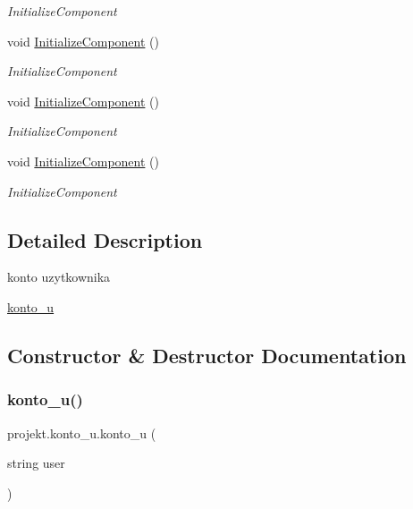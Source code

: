 \begin{DoxyCompactItemize}
\begin{DoxyCompactList}\small\item\em Initialize\+Component \end{DoxyCompactList}\item 
void \mbox{\hyperlink{classprojekt_1_1konto__u_aba94445ce67074714f9c38935885c165}{Initialize\+Component}} ()
\begin{DoxyCompactList}\small\item\em Initialize\+Component \end{DoxyCompactList}\item 
void \mbox{\hyperlink{classprojekt_1_1konto__u_aba94445ce67074714f9c38935885c165}{Initialize\+Component}} ()
\begin{DoxyCompactList}\small\item\em Initialize\+Component \end{DoxyCompactList}\item 
void \mbox{\hyperlink{classprojekt_1_1konto__u_aba94445ce67074714f9c38935885c165}{Initialize\+Component}} ()
\begin{DoxyCompactList}\small\item\em Initialize\+Component \end{DoxyCompactList}\end{DoxyCompactItemize}


\subsection{Detailed Description}
konto uzytkownika 

\mbox{\hyperlink{classprojekt_1_1konto__u}{konto\+\_\+u}} 

\subsection{Constructor \& Destructor Documentation}
\mbox{\label{classprojekt_1_1konto__u_a3aac4a0ac7618c0eaf58f189236520f5}} 
\subsubsection{\texorpdfstring{konto\+\_\+u()}{konto\_u()}}
{\footnotesize\ttfamily projekt.\+konto\+\_\+u.\+konto\+\_\+u (\begin{DoxyParamCaption}\item[{string}]{user }\end{DoxyParamCaption})\hspace{0.3cm}{\ttfamily [inline]}}



